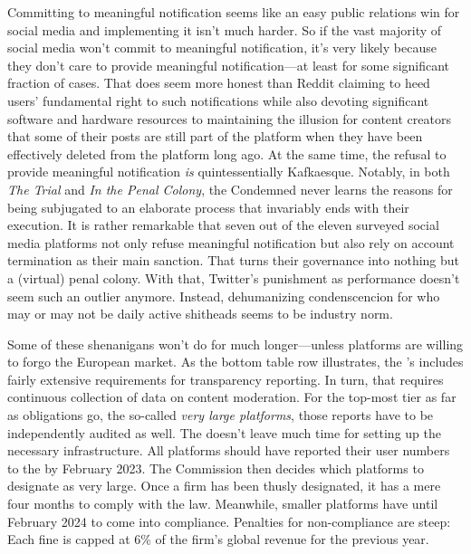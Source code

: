 Committing to meaningful notification seems like an easy public relations win
for social media and implementing it isn't much harder. So if the vast majority
of social media won't commit to meaningful notification, it's very likely
because they don't care to provide meaningful notification---at least for some
significant fraction of cases. That does seem more honest than Reddit claiming
to heed users' fundamental right to such notifications while also devoting
significant software and hardware resources to maintaining the illusion for
content creators that some of their posts are still part of the platform when
 they have been effectively deleted from the platform long ago. At the
same time, the refusal to provide meaningful notification \emph{is}
quintessentially Kafkaesque. Notably, in both \emph{The Trial} and \emph{In the
Penal Colony}, the Condemned never learns the reasons for being subjugated to an
elaborate process that invariably ends with their execution. It is rather
remarkable that seven out of the eleven surveyed social media platforms not only
refuse meaningful notification but also rely on account termination as their
main sanction. That turns their governance into nothing but a (virtual) penal
colony. With that, Twitter's punishment as performance doesn't seem such an
outlier anymore. Instead, dehumanizing condenscencion for who may or may not be
daily active shitheads seems to be industry norm.

Some of these shenanigans won't do for much longer---unless platforms are
willing to forgo the European market. As the bottom table row illustrates, the
's  includes fairly extensive requirements for transparency
reporting. In turn, that requires continuous collection of data on content
moderation. For the top-most tier as far as obligations go, the so-called
\emph{very large platforms}, those reports have to be independently audited as
well. The  doesn't leave much time for setting up the necessary
infrastructure. All platforms should have reported their user numbers to the
 by February 2023. The Commission then decides which platforms to
designate as very large. Once a firm has been thusly designated, it has a mere
four months to comply with the law. Meanwhile, smaller platforms have until
February 2024 to come into compliance. Penalties for non-compliance are steep:
Each fine is capped at 6\% of the firm's global revenue for the previous year.


